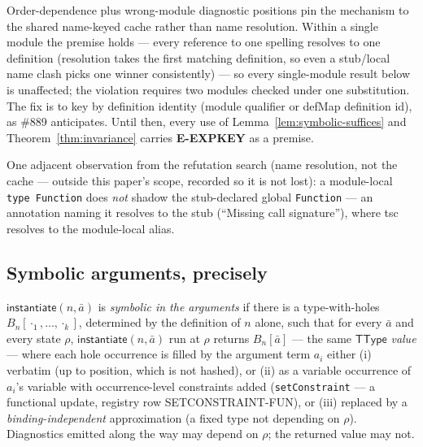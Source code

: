 \documentclass[11pt]{article}
\newcommand{\TType}{\mathsf{TType}}
\newcommand{\instop}{\mathsf{instantiate}}
\begin{document}
Order-dependence plus wrong-module diagnostic positions pin the
mechanism to the shared name-keyed cache rather than name resolution.
Within a single module the premise holds — every reference to one
spelling resolves to one definition (resolution takes the first
matching definition, so even a stub/local name clash picks one winner
consistently) — so every single-module result below is unaffected;
the violation requires two modules checked under one substitution.
The fix is to key by definition identity (module qualifier or defMap
definition id), as \#889 anticipates. Until then, every use of
Lemma~\ref{lem:symbolic-suffices} and Theorem~\ref{thm:invariance}
carries \textbf{E-EXPKEY} as a premise.

One adjacent observation from the refutation search (name resolution,
not the cache — outside this paper's scope, recorded so it is not
lost): a module-local \texttt{type Function} does \emph{not} shadow the
stub-declared global \texttt{Function} — an annotation naming it
resolves to the stub (``Missing call signature''), where tsc resolves
to the module-local alias.

\subsection{Symbolic arguments, precisely}

\begin{definition}
\label{def:symbolic}
$\instop(n, \bar{a})$ is \emph{symbolic in the arguments} if there is a
type-with-holes $B_n[\cdot_1,\dots,\cdot_k]$, determined by the
definition of $n$ alone, such that for every $\bar{a}$ and every state
$\rho$, $\instop(n,\bar{a})$ run at $\rho$ returns $B_n[\bar{a}]$ —
the same $\TType$ \emph{value} — where each hole occurrence is filled by
the argument term $a_i$ either (i) verbatim (up to
position, which is not hashed), or (ii) as a variable occurrence of
$a_i$'s variable with occurrence-level constraints added
(\texttt{setConstraint} — a functional update, registry row
SETCONSTRAINT-FUN), or (iii)
replaced by a \emph{binding-independent} approximation (a fixed type not
depending on $\rho$). Diagnostics emitted along the way may depend on
$\rho$; the returned value may not.
\end{definition}
\end{document}
